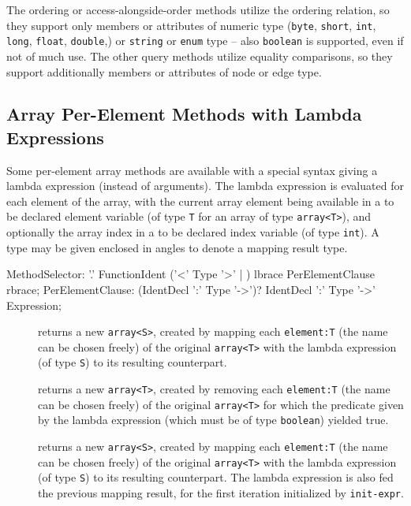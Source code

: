 The ordering or access-alongside-order methods utilize the ordering relation, so they support only members or attributes of numeric type (\texttt{byte}, \texttt{short}, \texttt{int}, \texttt{long}, \texttt{float}, \texttt{double},) or \texttt{string} or \texttt{enum} type -- also \texttt{boolean} is supported, even if not of much use.
The other query methods utilize equality comparisons, so they support additionally members or attributes of node or edge type.

\subsection{Array Per-Element Methods with Lambda Expressions} 

Some per-element array methods are available with a special syntax giving a lambda expression (instead of arguments).
The lambda expression is evaluated for each element of the array, with the current array element being available in a to be declared element variable (of type \texttt{T} for an array of type \texttt{array<T>}), and optionally the array index in a to be declared index variable (of type \texttt{int}).
A type may be given enclosed in angles to denote a mapping result type.

\begin{rail}
  MethodSelector: '.' FunctionIdent ('<' Type '>' | ) lbrace PerElementClause rbrace;
  PerElementClause: (IdentDecl ':' Type '->')? IdentDecl ':' Type '->' Expression;
\end{rail}

\begin{description}
\item[] returns a new \texttt{array<S>},
   created by mapping each \texttt{element:T} (the name can be chosen freely) of the original \texttt{array<T>} with the lambda expression (of type \texttt{S}) to its resulting counterpart.
\item[] returns a new \texttt{array<T>},
   created by removing each \texttt{element:T} (the name can be chosen freely) of the original \texttt{array<T>} for which the predicate given by the lambda expression (which must be of type \texttt{boolean}) yielded true.
\item[]
 returns a new \texttt{array<S>},
   created by mapping each \texttt{element:T} (the name can be chosen freely) of the original \texttt{array<T>} with the lambda expression (of type \texttt{S}) to its resulting counterpart.
	The lambda expression is also fed the previous mapping result, for the first iteration initialized by \texttt{init-expr}.
\end{description}

